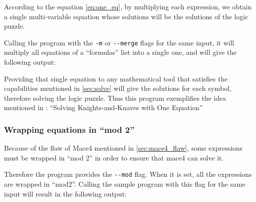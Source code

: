 According to the equation \ref{eq:one_eq}, by multiplying each expression, we obtain a single multi-variable equation whose solutions will be the solutions of the logic puzzle.

Calling the program with the \verb|-m| or \verb|--merge| flags for the same input, it will multiply all equations of a ``formulas'' list into a single one, and will give the following output:



Providing that single equation to any mathematical tool that satisfies the capabilities mentioned in \ref{sec:solve} will give the solutions for each symbol, therefore solving the logic puzzle. Thus this program exemplifies the idea mentioned in \cite{Ciraulo2020algebra}: ``Solving Knights-and-Knaves with One Equation''




\subsubsection{Wrapping equations in ``mod 2''}

Because of the flaw of Mace4 mentioned in \ref{sec:mace4_flaw}, some expressions must be wrapped in ``mod 2'' in order to ensure that mace4 can solve it.

Therefore the program provides the \verb|--mod| flag. When it is set, all the expressions are wrapped in ``mod2''. Calling the sample program with this flag for the same input will result in the following output:




